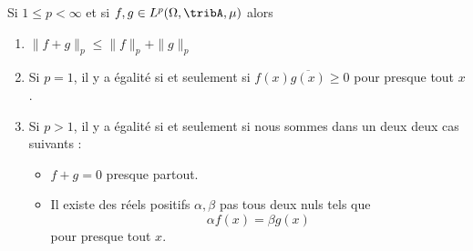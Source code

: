 \begin{proposition}     \label{PropInegMinkKUpRHg}
	Si \( 1\leq p<\infty\) et si \( f,g\in L^p(\Omega,\tribA,\mu)\) alors
	\begin{enumerate}
		\item   \label{ItemDHukLJi}
		      \( \| f+g \|_p\leq \| f \|_p+\| g \|_p\)
		\item       \label{ITEMooGRXBooMLRMww}
		      Si \( p=1\), il y a égalité si et seulement si \( f(x)\overline{ g(x) }\geq 0\) pour presque tout \( x\).
		\item       \label{ITEMooQCSHooNUDwtM}
		      Si \( p>1\), il y a égalité si et seulement si nous sommes dans un deux deux cas suivants :
		      \begin{itemize}
			      \item
			            \( f+g=0\) presque partout.
			      \item
			            Il existe des réels positifs \( \alpha,\beta\) pas tous deux nuls tels que
			            \begin{equation}
				            \alpha f(x)=\beta g(x)
			            \end{equation}
			            pour presque tout \( x\).
		      \end{itemize}
	\end{enumerate}
\end{proposition}

